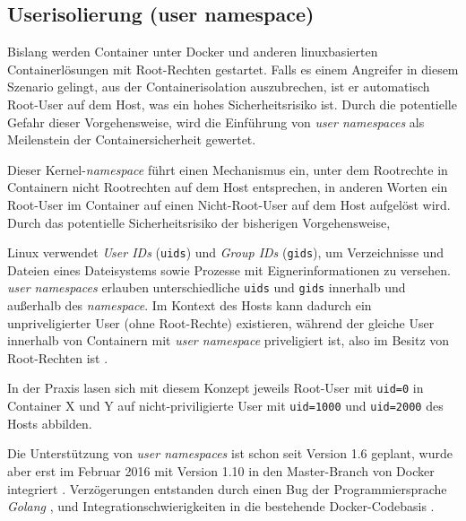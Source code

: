 \documentclass[../main.tex]{subfiles}
\begin{document}
    \subsection{Userisolierung (user namespace)}
			Bislang werden Container unter Docker und anderen linuxbasierten Containerlösungen mit Root-Rechten gestartet. Falls es einem Angreifer in diesem Szenario gelingt, aus der Containerisolation auszubrechen, ist er automatisch Root-User auf dem Host, was ein hohes Sicherheitsrisiko ist. Durch die potentielle Gefahr dieser Vorgehensweise, wird die Einführung von \emph{user namespaces} als Meilenstein der Containersicherheit gewertet.

			Dieser Kernel-\emph{namespace} führt einen Mechanismus ein, unter dem Rootrechte in Containern nicht Rootrechten auf dem Host entsprechen, in anderen Worten ein Root-User im Container auf einen Nicht-Root-User auf dem Host aufgelöst wird. Durch das potentielle Sicherheitsrisiko der bisherigen Vorgehensweise,

			Linux verwendet \emph{User IDs} (\texttt{uids}) und \emph{Group IDs} (\texttt{gids}), um Verzeichnisse und Dateien eines Dateisystems sowie Prozesse mit Eignerinformationen zu versehen. \emph{user namespaces} erlauben unterschiedliche \texttt{uids} und \texttt{gids} innerhalb und außerhalb des \emph{namespace}. Im Kontext des Hosts kann dadurch ein unpriveligierter User (ohne Root-Rechte) existieren, während der gleiche User innerhalb von Containern mit \emph{user namespace} priveligiert ist, also im Besitz von Root-Rechten ist \cite{nsUser}.

			In der Praxis lasen sich mit diesem Konzept jeweils Root-User mit \texttt{uid=0} in Container X und Y auf nicht-priviligierte User mit \texttt{uid=1000} und \texttt{uid=2000} des Hosts abbilden.


			Die Unterstützung von \emph{user namespaces} ist schon seit Version 1.6 geplant, wurde aber erst im Februar 2016 mit Version 1.10 in den Master-Branch von Docker integriert \cite{githubDockerChangelog}\cite{githubUserNamespaceProposal}. Verzögerungen entstanden durch einen Bug der Programmiersprache \emph{Golang} \cite{nsUserGolangBug}, und Integrationschwierigkeiten in die bestehende Docker-Codebasis \cite{githubUserNamespaceConflict}.
\end{document}
